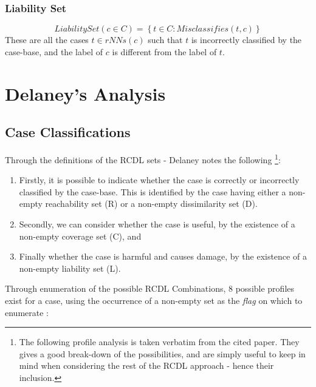 \documentclass[a4paper,11pt]{report}
\begin{document}
\subsubsection{Liability Set}
\[ LiabilitySet(c \in C) = \left\lbrace t \in C : Misclassifies(t, c) \right\rbrace \]  
These are all the cases $ t \in rNNs(c) $ such that $t$ is incorrectly classified by the case-base, and the label of $c$ is different from the label of $t$.

\section{Delaney's Analysis}

\subsection{Case Classifications}
Through the definitions of the RCDL sets - Delaney notes the following \citep{Delany2009}\footnote{The following profile analysis is taken verbatim from the cited paper. They gives a good break-down of the possibilities, and are simply useful to keep in mind when considering the rest of the RCDL approach - hence their inclusion.}:

\begin{enumerate}
	\item Firstly, it is possible to indicate whether the case is correctly or incorrectly classified by the case-base. This is identified by the case having either a non-empty reachability set (R) or a non-empty dissimilarity set (D).
	\item Secondly, we can consider whether the case is useful, by the existence of a non-empty coverage set (C), and
	\item Finally whether the case is harmful and causes damage, by the existence of a non-empty liability set (L).
\end{enumerate}

Through enumeration of the possible RCDL Combinations, 8 possible profiles exist for a case, using the occurrence of a non-empty set as the \emph{flag} on which to enumerate \citep{Delany2009}:
\end{document}
